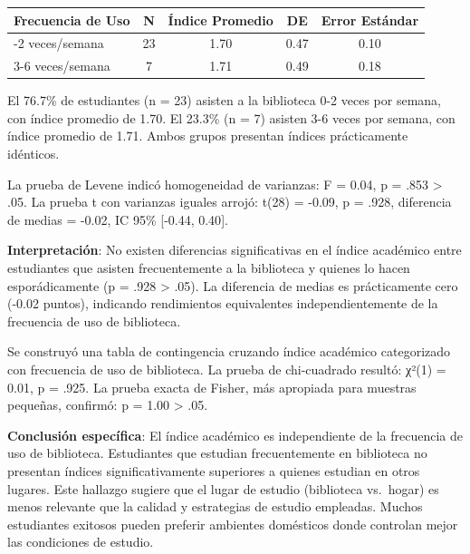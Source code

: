 \documentclass[
  stu,
  floatsintext,
  longtable,
  a4paper,
  nolmodern,
  notxfonts,
  notimes,
  12pt,
  colorlinks=true,linkcolor=blue,citecolor=blue,urlcolor=blue]{apa7}
\newcounter{none} %
\begin{document}
\begin{table}

{\caption{{Estadísticas Descriptivas del Índice según Frecuencia de Uso
de Biblioteca}{\label{tbl-biblioteca-descriptivos}}}}

{\def\LTcaptype{none} %
\begin{longtable}[]{@{}lcccc@{}}
\toprule\noalign{}
Frecuencia de Uso & N & Índice Promedio & DE & Error Estándar \\
\midrule\noalign{}
\endhead
\bottomrule\noalign{}
\endlastfoot
0-2 veces/semana & 23 & 1.70 & 0.47 & 0.10 \\
3-6 veces/semana & 7 & 1.71 & 0.49 & 0.18 \\
\end{longtable}
}

\end{table}

El 76.7\% de estudiantes (n = 23) asisten a la biblioteca 0-2 veces por
semana, con índice promedio de 1.70. El 23.3\% (n = 7) asisten 3-6 veces
por semana, con índice promedio de 1.71. Ambos grupos presentan índices
prácticamente idénticos.

La prueba de Levene indicó homogeneidad de varianzas: F = 0.04, p = .853
\textgreater{} .05. La prueba t con varianzas iguales arrojó: t(28) =
-0.09, p = .928, diferencia de medias = -0.02, IC 95\% {[}-0.44,
0.40{]}.

\textbf{Interpretación}: No existen diferencias significativas en el
índice académico entre estudiantes que asisten frecuentemente a la
biblioteca y quienes lo hacen esporádicamente (p = .928 \textgreater{}
.05). La diferencia de medias es prácticamente cero (-0.02 puntos),
indicando rendimientos equivalentes independientemente de la frecuencia
de uso de biblioteca.

Se construyó una tabla de contingencia cruzando índice académico
categorizado con frecuencia de uso de biblioteca. La prueba de
chi-cuadrado resultó: χ²(1) = 0.01, p = .925. La prueba exacta de
Fisher, más apropiada para muestras pequeñas, confirmó: p = 1.00
\textgreater{} .05.

\textbf{Conclusión específica}: El índice académico es independiente de
la frecuencia de uso de biblioteca. Estudiantes que estudian
frecuentemente en biblioteca no presentan índices significativamente
superiores a quienes estudian en otros lugares. Este hallazgo sugiere
que el lugar de estudio (biblioteca vs.~hogar) es menos relevante que la
calidad y estrategias de estudio empleadas. Muchos estudiantes exitosos
pueden preferir ambientes domésticos donde controlan mejor las
condiciones de estudio.
\end{document}
